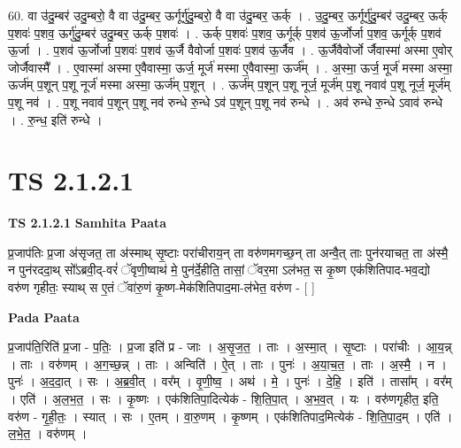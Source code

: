 \documentclass[17pt]{extarticle}
\begin{document}
60. वा उ॑दु॒म्बर॑ उदु॒म्बरो॒ वै वा उ॑दु॒म्बर॒ ऊर्गूर्गु॑दु॒म्बरो॒ वै वा उ॑दु॒म्बर॒ ऊर्क् । . उ॒दु॒म्बर॒ ऊर्गूर्गु॑दु॒म्बर॑ उदु॒म्बर॒ ऊर्क् प॒शवः॑ प॒शव॒ ऊर्गु॑दु॒म्बर॑ उदु॒म्बर॒ ऊर्क् प॒शवः॑ । . ऊर्क् प॒शवः॑ प॒शव॒ ऊर्गूर्क् प॒शव॑ ऊ॒र्जोर्जा प॒शव॒ ऊर्गूर्क् प॒शव॑ ऊ॒र्जा । . प॒शव॑ ऊ॒र्जोर्जा प॒शवः॑ प॒शव॑ ऊ॒र्जै वैवोर्जा प॒शवः॑ प॒शव॑ ऊ॒र्जैव । . ऊ॒र्जैवैवोर्जो र्जैवास्मा॑ अस्मा ए॒वोर् जोर्जैवास्मै᳚ । . ए॒वास्मा॑ अस्मा ए॒वैवास्मा॒ ऊर्ज॒ मूर्ज॑ मस्मा ए॒वैवास्मा॒ ऊर्ज᳚म् । . अ॒स्मा॒ ऊर्ज॒ मूर्ज॑ मस्मा अस्मा॒ ऊर्ज॑म् प॒शून् प॒शू नूर्ज॑ मस्मा अस्मा॒ ऊर्ज॑म् प॒शून् । . ऊर्ज॑म् प॒शून् प॒शू नूर्ज॒ मूर्ज॑म् प॒शू नवाव॑ प॒शू नूर्ज॒ मूर्ज॑म् प॒शू नव॑ । . प॒शू नवाव॑ प॒शून् प॒शू नव॑ रुन्धे रु॒न्धे ऽव॑ प॒शून् प॒शू नव॑ रुन्धे । . अव॑ रुन्धे रु॒न्धे ऽवाव॑ रुन्धे । . रु॒न्ध॒ इति॑ रुन्धे । \newline
\pagebreak
{}
\section*{ TS 2.1.2.1 }

\textbf{TS 2.1.2.1 } \newline
\textbf{Samhita Paata} \newline

प्र॒जाप॑तिः प्र॒जा अ॑सृजत॒ ता अ॑स्माथ् सृ॒ष्टाः परा॑चीराय॒न् ता वरु॑णमगच्छ॒न् ता अन्वै॒त् ताः पुन॑रयाचत॒ ता अ॑स्मै॒ न पुन॑रददा॒थ् सो᳚ऽब्रवी॒द्-वरं॑ ॅवृणी॒ष्वाथ॑ मे॒ पुन॑र्दे॒हीति॒ तासां॒ ॅवर॒मा ऽल॑भत॒ स कृ॒ष्ण एक॑शितिपाद-भव॒द्यो वरु॑ण गृहीतः॒ स्याथ् स ए॒तं ॅवा॑रु॒णं कृ॒ष्ण-मेक॑शितिपाद॒मा-ल॑भेत॒ वरु॑ण - [  ] \newline

\textbf{Pada Paata} \newline

प्र॒जाप॑ति॒रिति॑ प्र॒जा - प॒तिः॒ । प्र॒जा इति॑ प्र - जाः । अ॒सृ॒ज॒त॒ । ताः । अ॒स्मा॒त् । सृ॒ष्टाः । परा॑चीः । आ॒य॒न्न् । ताः । वरु॑णम् । अ॒ग॒च्छ॒न्न् । ताः । अन्विति॑ । ऐ॒त् । ताः । पुनः॑ । अ॒या॒च॒त॒ । ताः । अ॒स्मै॒ । न । पुनः॑ । अ॒द॒दा॒त् । सः । अ॒ब्र॒वी॒त् । वर᳚म् । वृ॒णी॒ष्व॒ । अथ॑ । मे॒ । पुनः॑ । दे॒हि॒ । इति॑ । तासा᳚म् । वर᳚म् । एति॑ । अ॒ल॒भ॒त॒ । सः । कृ॒ष्णः । एक॑शितिपा॒दित्येक॑ - शि॒ति॒पा॒त् । अ॒भ॒व॒त् । यः । वरु॑णगृहीत॒ इति॒ वरु॑ण - गृ॒ही॒तः॒ । स्यात् । सः । ए॒तम् । वा॒रु॒णम् । कृ॒ष्णम् । एक॑शितिपाद॒मित्येक॑ - शि॒ति॒पा॒द॒म् । एति॑ । ल॒भे॒त॒ । वरु॑णम् ।  \newline
\end{document}
